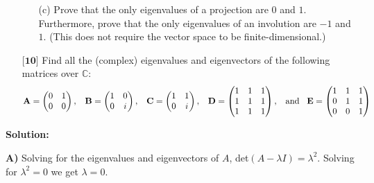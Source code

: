 \documentclass[12pt]{article}
\begin{document}
\begin{itemize}
\begin{itemize}
    \vspace{.3cm}
    \item[(c)]
    Prove that the only eigenvalues of a projection are $0$ and $1$. Furthermore, prove that the only eigenvalues of an involution are $-1$ and $1$. (This does not require the vector space to be finite-dimensional.)
    
    \end{itemize}
    
    
    \item[$\textbf{[10]}$]
    Find all the (complex) eigenvalues and eigenvectors of the following matrices over $\mathbb{C}$:
    \begin{equation*}
    \mathbf{A} = \begin{pmatrix}
    0 & 1 \\
    0 & 0
    \end{pmatrix}, \hspace{.3cm} \mathbf{B} = \begin{pmatrix}
    1 & 0 \\
    0 & i
    \end{pmatrix}, \hspace{.3cm} \mathbf{C} = \begin{pmatrix}
    1 & 1 \\
    0 & i
    \end{pmatrix}, \hspace{.3cm} \mathbf{D} = \begin{pmatrix}
    1 & 1 & 1 \\
    1 & 1 & 1 \\
    1 & 1 & 1
    \end{pmatrix}, \hspace{.3cm} \text{and} \hspace{.3cm} \mathbf{E} = \begin{pmatrix}
    1 & 1 & 1 \\
    0 & 1 & 1 \\
    0 & 0 & 1
    \end{pmatrix}
    \end{equation*}
    
    \end{itemize}

    \textbf{Solution:}

    \textbf{A)} Solving for the eigenvalues and eigenvectors of $A$, det$(A - \lambda I) = \lambda^2$. Solving for $\lambda^2 = 0$ we get $\lambda = 0$. 
\end{document}
